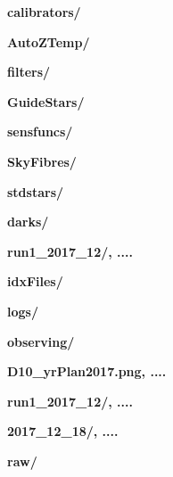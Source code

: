 \documentclass[12pt]{article}
\begin{document}
\hspace{10mm} \textbf{calibrators/} 
\vspace{1mm}

\hspace{15mm} \textbf{AutoZTemp/} 
\vspace{1mm}

\hspace{15mm} \textbf{filters/} 
\vspace{1mm}

\hspace{15mm} \textbf{GuideStars/}
\vspace{1mm}

\hspace{15mm} \textbf{sensfuncs/}
\vspace{1mm}

\hspace{15mm} \textbf{SkyFibres/}
\vspace{1mm}

\hspace{15mm} \textbf{stdstars/}
\vspace{1mm}

\hspace{10mm} \textbf{darks/} 
\vspace{1mm}

\hspace{15mm} \textbf{run1\_2017\_12/, ....}
\vspace{1mm}

\hspace{10mm} \textbf{idxFiles/} 
\vspace{1mm}

\hspace{10mm} \textbf{logs/} 
\vspace{1mm}

\hspace{10mm} \textbf{observing/} 
\vspace{1mm}

\hspace{15mm} \textbf{D10\_yrPlan2017.png, ....} 
\vspace{1mm}

\hspace{15mm} \textbf{run1\_2017\_12/, ....} 
\vspace{1mm}

\hspace{30mm} \textbf{2017\_12\_18/, ....}
\vspace{1mm}

\hspace{10mm} \textbf{raw/} 
\vspace{1mm}
\end{document}
